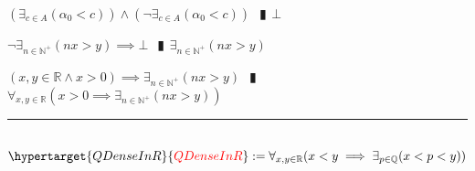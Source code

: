 \documentclass{book}
\newcommand{\df}[1]{\hypertarget{#1}{\textcolor{red}{#1}}}
\newcommand{\abr}{:=}
\newcommand{\pipe}{$\phantom{(}\vrectangleblack\phantom{)}$}
\begin{document}
\begin{enumerate}
\begin{enumerate}
\begin{enumerate}
      \lit $(\exists_{c \in A}(\alpha_0 < c)) \land (\lnot \exists_{c \in A}(\alpha_0 < c))$ \pipe $\bot$
    \end{enumerate}
    \lit $\lnot \exists_{n \in \mathbb{N}^+}(n x > y) \implies \bot$ \pipe $\exists_{n \in \mathbb{N}^+}(n x > y)$
  \end{enumerate}
  \lit $(x, y \in \mathbb{R} \land x > 0) \implies \exists_{n \in \mathbb{N}^+}(n x > y)$ \pipe $\forall_{x, y \in \mathbb{R}}(x > 0 \implies \exists_{n \in \mathbb{N}^+}(n x > y))$
\end{enumerate} \vspace{.75mm} \hrule \vspace{.75mm} \ \\ 

$\df{QDenseInR} \abr \forall_{x, y \in \mathbb{R}}(x < y \implies \exists_{p \in \mathbb{Q}}(x < p < y))$
\end{document}
